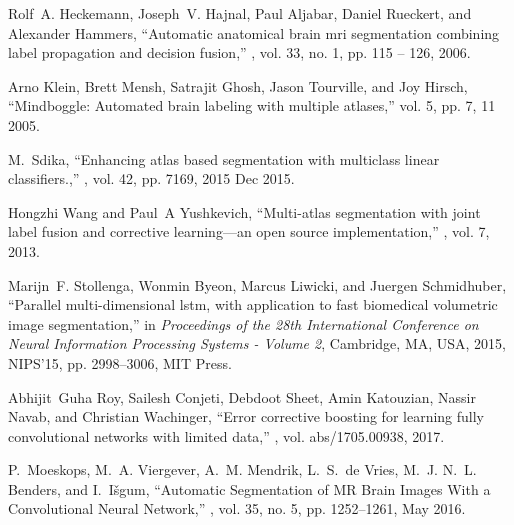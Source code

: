\documentclass{article}
\begin{document}

\begin{thebibliography}{10}

Rolf~A. Heckemann, Joseph~V. Hajnal, Paul Aljabar, Daniel Rueckert, and
  Alexander Hammers,
\newblock ``Automatic anatomical brain mri segmentation combining label
  propagation and decision fusion,''
, vol. 33, no. 1, pp. 115 -- 126, 2006.

Arno Klein, Brett Mensh, Satrajit Ghosh, Jason Tourville, and Joy Hirsch,
\newblock ``Mindboggle: Automated brain labeling with multiple atlases,''
\newblock vol. 5, pp. 7, 11 2005.

M.~Sdika,
\newblock ``Enhancing atlas based segmentation with multiclass linear
  classifiers.,''
, vol. 42, pp. 7169, 2015 Dec 2015.

Hongzhi Wang and Paul~A Yushkevich,
\newblock ``Multi-atlas segmentation with joint label fusion and corrective
  learning—an open source implementation,''
, vol. 7, 2013.

Marijn~F. Stollenga, Wonmin Byeon, Marcus Liwicki, and Juergen Schmidhuber,
\newblock ``Parallel multi-dimensional lstm, with application to fast
  biomedical volumetric image segmentation,''
\newblock in {\em Proceedings of the 28th International Conference on Neural
  Information Processing Systems - Volume 2}, Cambridge, MA, USA, 2015,
  NIPS'15, pp. 2998--3006, MIT Press.

Abhijit~Guha Roy, Sailesh Conjeti, Debdoot Sheet, Amin Katouzian, Nassir Navab,
  and Christian Wachinger,
\newblock ``Error corrective boosting for learning fully convolutional networks
  with limited data,''
, vol. abs/1705.00938, 2017.

P.~Moeskops, M.~A. Viergever, A.~M. Mendrik, L.~S.~de Vries, M.~J. N.~L.
  Benders, and I.~Išgum,
\newblock ``Automatic {Segmentation} of {MR} {Brain} {Images} {With} a
  {Convolutional} {Neural} {Network},''
, vol. 35, no. 5, pp.
  1252--1261, May 2016.


\end{thebibliography}
\end{document}
